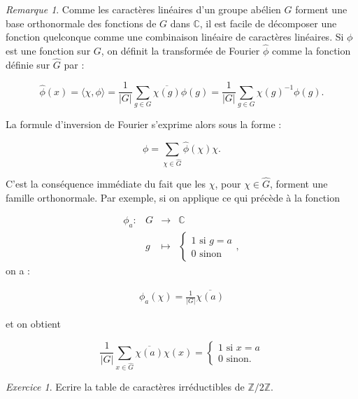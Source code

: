 \documentclass[french]{book}
\theoremstyle{definition}
\theoremstyle{remark}
\newtheorem*{remark}{Remarque}
\newtheorem{exo}{Exercice}
\begin{document}
\begin{remark}
  Comme les caractères linéaires d'un groupe abélien \(G\) forment une base orthonormale des fonctions de \(G\) dans \(\mathbb{C}\), il est facile de décomposer une fonction quelconque comme une combinaison linéaire de caractères linéaires. Si \(\phi\) est une fonction sur \(G\), on définit la transformée de Fourier \(\hat{\phi}\) comme la fonction définie sur \(\hat{G}\) par :

  \[\hat{\phi}(x) = \langle \chi, \phi \rangle = \frac{1}{\left\lvert G \right\rvert} \sum_{g \in G} \overline{\chi(g)} \phi(g) =\frac{1}{\left\lvert G \right\rvert} \sum_{g \in G} \chi(g)^{-1} \phi(g).\]

  La formule d'inversion de Fourier s'exprime alors sous la forme :

  \[\phi = \sum_{\chi \in \hat{G}} \hat{\phi}(\chi) \chi.\]

  C'est la conséquence immédiate du fait que les \(\chi\), pour \(\chi \in \hat{G}\), forment une famille orthonormale. Par exemple, si on applique ce qui précède à la fonction

  \[\begin{matrix}
  \phi_a : & G & \longrightarrow & \mathbb{C} \\
  \ & g & \longmapsto & \begin{cases}
    1 \text{ si } g=a \\
    0 \text{ sinon}
  \end{cases},
  \end{matrix}\] on a :

  \begin{gather*}
    \phi_a(\chi) = \frac{1}{\left\lvert G \right\rvert} \overline{\chi(a)}
  \end{gather*}

  et on obtient

  \[\frac{1}{\left\lvert G \right\rvert} \sum_{x \in \hat{G}} \overline{\chi(a)} \chi(x) = \begin{cases}
    1 \text{ si } x=a \\
    0 \text{ sinon. }
  \end{cases}  \]
\end{remark}

\begin{exo}
  Ecrire la table de caractères irréductibles de \(\mathbb{Z}/{2}\mathbb{Z}\).
\end{exo}
\end{document}
